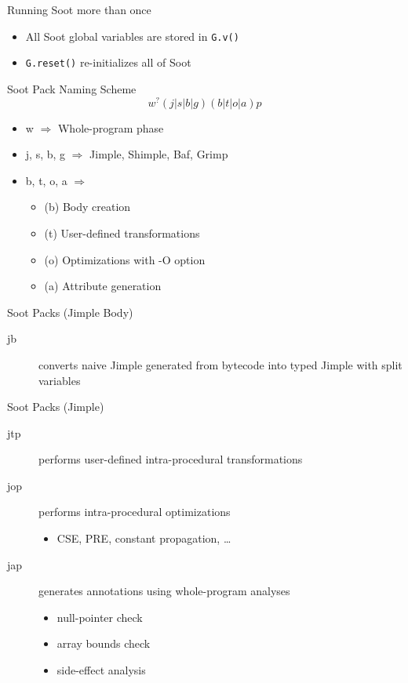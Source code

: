 \begin{slide}{Running Soot more than once}
\begin{itemize}
\item All Soot global variables are stored in \texttt{G.v()}
\item \texttt{G.reset()} re-initializes all of Soot
\end{itemize}
\end{slide}



\begin{slide}{Soot Pack Naming Scheme}
\vspace*{-0.2in}
\[ w^? (j|s|b|g) (b|t|o|a)p \]

\begin{itemize}
\item w $\Rightarrow$ Whole-program phase
\item j, s, b, g $\Rightarrow$ Jimple, Shimple, Baf, Grimp
\item b, t, o, a $\Rightarrow$
\begin{itemize}
\item (b) Body creation
\item (t) User-defined transformations
\item (o) Optimizations with -O option
\item (a) Attribute generation
\end{itemize}
\end{itemize}
\end{slide}


\begin{slide}{Soot Packs (Jimple Body)}
\begin{description}
\item[jb] converts naive Jimple generated from bytecode into
typed Jimple with split variables
\end{description}
\end{slide}

\begin{slide}{Soot Packs (Jimple)}
\begin{description}
\item[jtp] performs user-defined intra-procedural transformations
\item[jop] performs intra-procedural optimizations
\begin{itemize}
\item CSE, PRE, constant propagation, \ldots
\end{itemize}
\item[jap] generates annotations using whole-program analyses
\begin{itemize}
\item null-pointer check
\item array bounds check
\item side-effect analysis
\end{itemize}
\end{description}
\end{slide}

